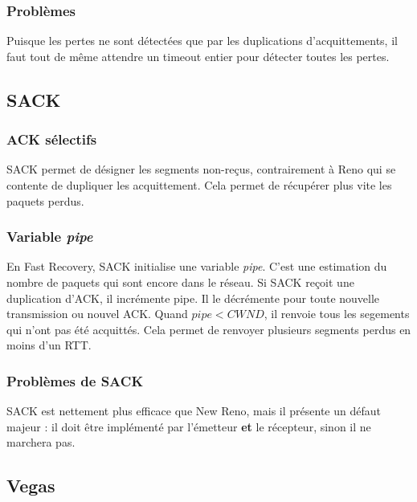 \documentclass[	DIV=calc,%
							paper=a4,%
							fontsize=11pt,%
							twocolumn]{scrartcl}	 					%
\begin{document}
\subsubsection*{Problèmes}
Puisque les pertes ne sont détectées que par les duplications d'acquittements, il faut tout de même attendre un timeout entier pour détecter toutes les pertes. 
\subsection*{SACK}
\subsubsection*{ACK sélectifs}
SACK permet de désigner les segments non-reçus, contrairement à Reno qui se contente de dupliquer les acquittement. Cela permet de récupérer plus vite les paquets perdus.
\subsubsection*{Variable \textit{pipe}}
En Fast Recovery, SACK initialise une variable \textit{pipe}. C'est une estimation du nombre de paquets qui sont encore dans le réseau. Si SACK reçoit une duplication d'ACK, il incrémente pipe. Il le décrémente pour toute nouvelle transmission ou nouvel ACK. Quand $ pipe < CWND$, il renvoie tous les segements qui n'ont pas été acquittés. Cela permet de renvoyer plusieurs segments perdus en moins d'un RTT.
\subsubsection*{Problèmes de SACK}
SACK est nettement plus efficace que New Reno, mais il présente un défaut majeur : il doit être implémenté par l'émetteur \textbf{et} le récepteur, sinon il ne marchera pas.
\subsection*{Vegas}
\end{document}
